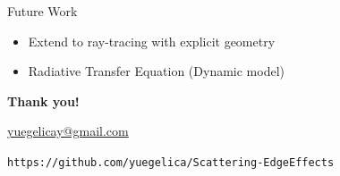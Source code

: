 \documentclass[aspectratio=169,xcolor=dvipsnames]{beamer}
\begin{document}
\begin{frame}{Future Work}
  \begin{itemize}
    \item Extend to ray-tracing with explicit geometry
    \item Radiative Transfer Equation (Dynamic model)
  \end{itemize}
\end{frame}

\begin{frame}[plain]
  \centering
  \Huge \textbf{Thank you!}
  
  \vspace{1cm}
  \normalsize
  \href{mailto:your@email.com}{yuegelicay@gmail.com}
  
  \vspace{0.5cm}
  \small
  \texttt{https://github.com/yuegelica/Scattering-EdgeEffects}
\end{frame}

    

%   
%   
\end{document}
